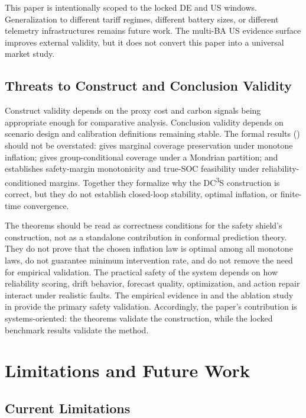 \documentclass[11pt,a4paper]{article}
\begin{document}
This paper is intentionally scoped to the locked DE and US windows. Generalization to different tariff regimes, different battery sizes, or different telemetry infrastructures remains future work. The multi-BA US evidence surface improves external validity, but it does not convert this paper into a universal market study.

\subsection{Threats to Construct and Conclusion Validity}

Construct validity depends on the proxy cost and carbon signals being appropriate enough for comparative analysis. Conclusion validity depends on scenario design and calibration definitions remaining stable. The formal results () should not be overstated:  gives marginal coverage preservation under monotone inflation;  gives group-conditional coverage under a Mondrian partition; and  establishes safety-margin monotonicity and true-SOC feasibility under reliability-conditioned margins. Together they formalize why the DC\textsuperscript{3}S construction is correct, but they do not establish closed-loop stability, optimal inflation, or finite-time convergence.

The theorems should be read as correctness conditions for the safety shield's construction, not as a standalone contribution in conformal prediction theory. They do not prove that the chosen inflation law is optimal among all monotone laws, do not guarantee minimum intervention rate, and do not remove the need for empirical validation. The practical safety of the system depends on how reliability scoring, drift behavior, forecast quality, optimization, and action repair interact under realistic faults. The empirical evidence in  and the ablation study in  provide the primary safety validation. Accordingly, the paper's contribution is systems-oriented: the theorems validate the construction, while the locked benchmark results validate the method.

\section{Limitations and Future Work}\label{sec:limitations}

\subsection{Current Limitations}
\end{document}
